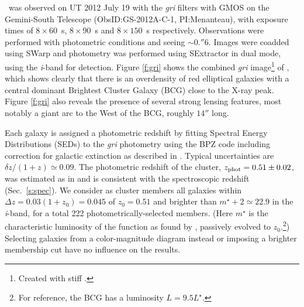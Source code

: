 \plck\ was observed on UT 2012 July 19 with the {\it gri} filters with GMOS on the Gemini-South
Telescope (ObsID:GS-2012A-C-1, PI:Menanteau), with exposure times of $8\times60$~s, $8\times90$~s
and $8\times150$~s respectively. Observations were performed with photometric conditions and seeing
$\sim0.\!''6$. Images were coadded using SWarp \citep{bertin02} and photometry was performed 
using
SExtractor \citep{bertin96} in dual mode, using the {\it i}-band for detection. Figure 
\ref{f:gri}
shows the combined {\it gri} image\footnote{Created with {\sc stiff} \citep{bertin12}.} of 
\plck, which
shows clearly that there is an overdensity of red elliptical galaxies with a central dominant
Brightest Cluster Galaxy (BCG) close to the X-ray peak. Figure \ref{f:gri} also reveals the presence
of several strong lensing features, most notably a giant arc to the West of the BCG, roughly
$14''$ long.

Each galaxy is assigned a photometric redshift by fitting Spectral Energy Distributions (SEDs) to
the {\it gri} photometry using the BPZ code \citep{benitez00} including correction for galactic
extinction as described in \cite{menanteau10_act,menanteau10_scs}. Typical uncertainties are $\delta
z/(1+z)\simeq0.09$. The photometric redshift of the cluster, $z_{\rm phot}=0.51\pm0.02$, was
estimated as in \cite{menanteau10_act,menanteau10_scs} and is consistent with the spectroscopic redshift
(Sec.~\ref{s:spec}). We consider as cluster members all galaxies within $\Delta z=0.03(1+z_0) =
0.045$ of $z_0=0.51$ and brighter than $m^\star+2\simeq22.9$ in the {\it i}-band, for a total 222
photometrically-selected members. (Here $m^\star$ is the characteristic luminosity of the 
\cite{schechter76} function as found by \cite{blanton03}, passively evolved to $z_0$.\footnote{For 
reference, the BCG has a luminosity $L=9.5L^\star$.}) Selecting galaxies from a color-magnitude 
diagram instead or imposing a brighter membership cut have no influence on the results.

